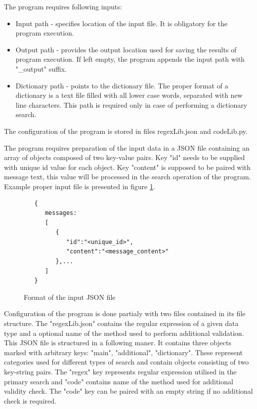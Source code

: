 \documentclass[a4paper,twoside,12pt]{book}
\begin{document}
The program requires following inputs:

\begin{itemize}
   \item Input path - specifies location of the input file. It is obligatory for the program execution.
   \item Output path - provides the output location used for saving the results of program execution. 
   If left empty, the program appends the input path with "\_output" suffix. 
   \item Dictionary path - points to the dictionary file. The proper format of a dictionary
   is a text file filled with all lower case words, separated with new line characters. This path is required
   only in case of performing a dictionary search.
\end{itemize}

The configuration of the program is stored in files regexLib.json and codeLib.py.

The program requires preparation of the input data in a JSON file containing
an array of objects composed of two key-value pairs. Key "id" needs to be 
supplied with unique id value for each object. Key "content" is supposed to be 
paired with message text, this value will be processed in the search operation 
of the program. Example proper input file is presented in figure \ref{fig:inputFormat}.

\begin{figure}
   \centering
   \begin{lstlisting}
   {
      messages:
      [
         {
            "id":"<unique_id>",
            "content":"<message_content>"
         },...
      ]
   }
   \end{lstlisting}
   \caption{Format of the input JSON file}
   \label{fig:inputFormat}
\end{figure}

Configuration of the program is done partialy with two files contained in its
file structure. The "regexLib.json" contains the regular expression of a given
data type and a optional name of the method used to perform additional 
validation. This JSON file is structured in a following maner. It contains
three objects marked with arbitrary keys: "main", "additional", "dictionary".
These represent categories used for different types of search and contain
objects consisting of two key-string pairs. The "regex" key represents regular
expression utilised in the primary search and "code" contains name of the method 
used for additional validity check. The "code" key can be paired with an empty string
if no additional check is required.
\end{document}
